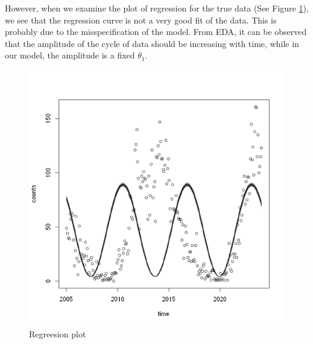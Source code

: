 \documentclass{article}
\begin{document}
However, when we examine the plot of regression for the true data (See Figure \ref{fig:regrssion}), we see that the regression curve is not a very good fit of the data. This is probably due to the misspecification of the model. From EDA, it can be observed that the amplitude of the cycle of data should be increasing with time, while in our model, the amplitude is a fixed $\theta_1$.
\begin{figure}[!ht]
  \centering
  \includegraphics[width=\textwidth, height=0.6\textheight]{regression.png}
  \caption{Regreesion plot}
  \label{fig:regrssion}
\end{figure}
\end{document}
